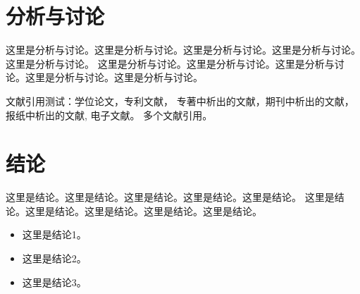 \section{分析与讨论}

这里是分析与讨论。这里是分析与讨论。这里是分析与讨论。这里是分析与讨论。这里是分析与讨论。
这里是分析与讨论。这里是分析与讨论。这里是分析与讨论。这里是分析与讨论。这里是分析与讨论。


文献引用测试：学位论文\cite{Zhang1998}，专利文献\cite{Jiang1989,HBLZ2001}，
专著中析出的文献\cite{Cheng1999,GBT2659}，期刊中析出的文献\cite{Li1999,Li2000}，
报纸中析出的文献\cite{Ding2000}, 电子文献\cite{Jiang1999,Christine1998,Xiao2001}。
多个文献引用\cite{Zhang1998,Jiang1999,Christine1998,Xiao2001}。


\section{结论}

这里是结论。这里是结论。这里是结论。这里是结论。这里是结论。
这里是结论。这里是结论。这里是结论。这里是结论。这里是结论。


\begin{itemize}
    \item 这里是结论1。
    \item 这里是结论2。
    \item 这里是结论3。
\end{itemize}


\newpage
